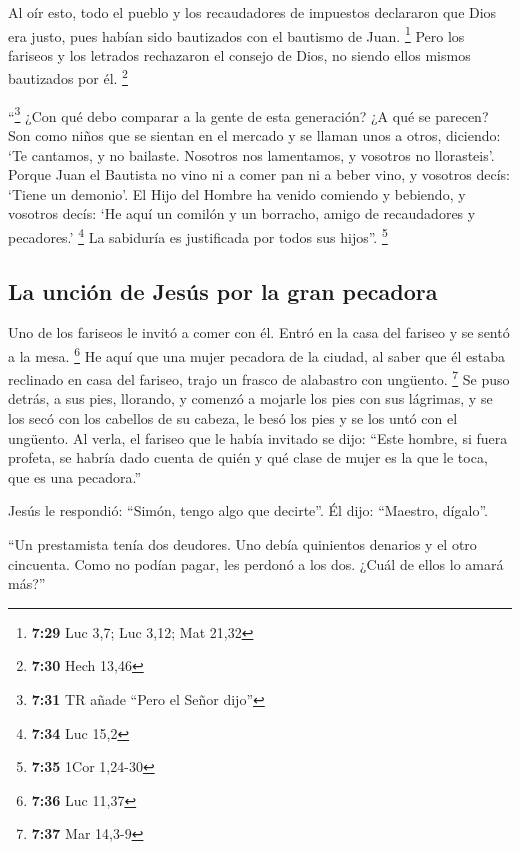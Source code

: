 \begin{paracol}{2}
 Al oír esto, todo el pueblo y los recaudadores de
impuestos declararon que Dios era justo, pues habían sido bautizados con
el bautismo de Juan. \footnote{\textbf{7:29} Luc 3,7; Luc 3,12; Mat
  21,32}  Pero los fariseos y los letrados rechazaron el
consejo de Dios, no siendo ellos mismos bautizados por él. \footnote{\textbf{7:30}
  Hech 13,46}

 ``\footnote{\textbf{7:31} TR añade ``Pero el Señor
  dijo''} ¿Con qué debo comparar a la gente de esta generación? ¿A qué
se parecen?  Son como niños que se sientan en el mercado
y se llaman unos a otros, diciendo: `Te cantamos, y no bailaste.
Nosotros nos lamentamos, y vosotros no llorasteis'. 
Porque Juan el Bautista no vino ni a comer pan ni a beber vino, y
vosotros decís: `Tiene un demonio'.  El Hijo del Hombre
ha venido comiendo y bebiendo, y vosotros decís: `He aquí un comilón y
un borracho, amigo de recaudadores y pecadores.' \footnote{\textbf{7:34}
  Luc 15,2}  La sabiduría es justificada por todos sus
hijos''. \footnote{\textbf{7:35} 1Cor 1,24-30}

\hypertarget{la-unciuxf3n-de-jesuxfas-por-la-gran-pecadora}{%
\subsection{La unción de Jesús por la gran
pecadora}\label{la-unciuxf3n-de-jesuxfas-por-la-gran-pecadora}}

 Uno de los fariseos le invitó a comer con él. Entró en
la casa del fariseo y se sentó a la mesa. \footnote{\textbf{7:36} Luc
  11,37}  He aquí que una mujer pecadora de la ciudad, al
saber que él estaba reclinado en casa del fariseo, trajo un frasco de
alabastro con ungüento. \footnote{\textbf{7:37} Mar 14,3-9}
 Se puso detrás, a sus pies, llorando, y comenzó a
mojarle los pies con sus lágrimas, y se los secó con los cabellos de su
cabeza, le besó los pies y se los untó con el ungüento. 
Al verla, el fariseo que le había invitado se dijo: ``Este hombre, si
fuera profeta, se habría dado cuenta de quién y qué clase de mujer es la
que le toca, que es una pecadora.''

 Jesús le respondió: ``Simón, tengo algo que decirte''.
Él dijo: ``Maestro, dígalo''.

 ``Un prestamista tenía dos deudores. Uno debía
quinientos denarios y el otro cincuenta.  Como no podían
pagar, les perdonó a los dos. ¿Cuál de ellos lo amará más?''


\end{paracol}
